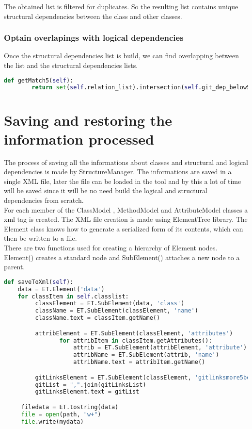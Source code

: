 \tab The obtained list is filtered for duplicates. So the resulting list contains unique structural dependencies between the class and other classes. 

\subsubsection{Optain overlapings with logical dependencies}

\tab Once the structural dependencies list is build, we can find overlapping between the list and the structural dependencies lists.

\begin{lstlisting}[language=python, caption={Get overlapping between structural dependencies and logical dependencies found in diff files with less then 5 files changed.}]
def getMatch5(self):
        return set(self.relation_list).intersection(self.git_dep_below5)
\end{lstlisting}

\section{Saving and restoring the information processed}
\tab The process of saving all the informations about classes and structural and logical dependencies is made by StructureManager. The informations are saved in a single XML file, later the file can be loaded in the tool and by this a lot of time will be saved since it will be no need build the logical and structural dependencies from scratch.\\ For each member of the ClassModel , MethodModel and AttributeModel classes a xml tag is created. The XML file creation is made using ElementTree library. The Element class knows how to generate a serialized form of its contents, which can then be written to a file.\\ There are two functions used for creating a hierarchy of Element nodes. Element() creates a 
standard node and SubElement() attaches a new node to a parent.

\begin{lstlisting}[language=python, caption={Save informations to XML file using ElementTree.}]
def saveToXml(self):
    data = ET.Element('data')
    for classItem in self.classlist:
         classElement = ET.SubElement(data, 'class')
         className = ET.SubElement(classElement, 'name')
         className.text = classItem.getName()

         attribElement = ET.SubElement(classElement, 'attributes')
                for attribItem in classItem.getAttributes():
                    attrib = ET.SubElement(attribElement, 'attribute')
                    attribName = ET.SubElement(attrib, 'name')
                    attribName.text = attribItem.getName()

         gitLinksElement = ET.SubElement(classElement, 'gitlinksmore5below20')
         gitList = ",".join(gitLinksList)
         gitLinksElement.text = gitList

     filedata = ET.tostring(data)
     file = open(path, "w+")
     file.write(mydata)
\end{lstlisting}

